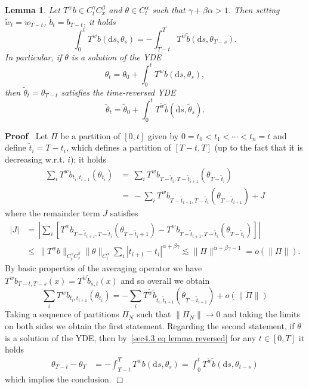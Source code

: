 \documentclass[10pt]{article}
\newcommand{\mathd}{\mathrm{d}}
\newenvironment{proof}{\noindent\textbf{Proof\ }}{\hspace*{\fill}$\Box$\medskip}
\newtheorem{lemma}{Lemma}
\begin{document}
\begin{lemma}
  \label{sec4.3 lemma reversed YDE}Let $T^w b \in C^{\gamma}_t C^{\beta}_x$
  and $\theta \in C^{\alpha}_t$ such that $\gamma + \beta \alpha > 1$. Then
  setting $\tilde{w}_t = w_{T - t}$, $\tilde{b}_t = b_{T - t}$, it holds
  \begin{equation}
    \int_0^t T^w b (\mathd s, \theta_s) = - \int_{T - t}^T T^{\tilde{w}}
    \tilde{b} (\mathd s, \theta_{T - s}) . \label{sec4.3 eq lemma reversed}
  \end{equation}
  In particular, if $\theta$ is a solution of the YDE
  \[ \theta_t = \theta_0 + \int_0^t T^w b (\mathd s, \theta_s), \]
  then $\tilde{\theta}_t = \theta_{T - t}$ satisfies the time-reversed YDE
  \[ \tilde{\theta}_t = \tilde{\theta}_0 + \int_0^t T^{\tilde{w}} \tilde{b}
     (\mathd s, \tilde{\theta}_s) . \]
\end{lemma}

\begin{proof}
  Let $\Pi$ be a partition of $[0, t]$ given by $0 = t_0 < t_1 < \cdots < t_n
  = t$ and define $\tilde{t}_i = T - t_i$, which defines a partition of $[T -
  t, T]$ (up to the fact that it is decreasing w.r.t. $i$); it holds
%  
  \begin{align*}
    \sum_i T^w b_{t_i, t_{i + 1}}^{} (\theta_{t_i}) & = \, \sum_i T^w b_{T -
    \tilde{t}_i, T - \tilde{t}_{i + 1}} (\theta_{T - \tilde{t}_i})\\
    & = \, - \sum_i T^w b_{T - \tilde{t}_{i + 1}, T - \tilde{t}_i} (\theta_{T
    - \tilde{t}_{i + 1}}) + J
  \end{align*}
%  
  where the remainder term $J$ satisfies
%  
  \begin{align*}
    | J | & = \, \left| \sum_i [T^w b_{T - \tilde{t}_{i + 1}, T - \tilde{t}_i}
    (\theta_{T - \tilde{t}_i + 1}) - T^w b_{T - \tilde{t}_{i + 1}, T -
    \tilde{t}_i} (\theta_{T - \tilde{t}_i})] \right|\\
    & \leqslant \, \| T^w b \|_{C^{\gamma}_t C^{\beta}_x}  \| \theta
    \|_{C_t^{\alpha}} \sum_i | t_{i + 1} - t_i |^{\alpha + \beta \gamma}
    \lesssim \| \Pi \|^{\alpha + \beta \gamma - 1} = o (\| \Pi \|) .
  \end{align*}
%  
  By basic properties of the averaging operator we have $T^w b_{T - t, T - s}
  (x) = T^{\tilde{w}} \tilde{b}_{s, t} (x)$ and so overall we obtain
  \[ \sum_i T^w b_{t_i, t_{i + 1}}^{} (\theta_{t_i}) = - \sum_i T^{\tilde{w}}
     \tilde{b}_{\tilde{t}_i, \tilde{t}_{i + 1}} (\theta_{T - \tilde{t}_{i +
     1}}) + o (\| \Pi \|) \]
  Taking a sequence of partitions $\Pi_N$ such that $\| \Pi_N \| \rightarrow
  0$ and taking the limits on both sides we obtain the first statement.
  Regarding the second statement, if $\theta$ is a solution of the YDE, then
  by~{\eqref{sec4.3 eq lemma reversed}} for any $t \in [0, T]$ it holds
%  
  \begin{align*}
    \theta_{T - t} - \theta_T & = - \int_{T - t}^T T^w b (\mathd s, \theta_s)
    = \int_0^t T^{\tilde{w}} \tilde{b} (\mathd s, \theta_{t - s})
  \end{align*}
%  
  which implies the conclusion.
\end{proof}
\end{document}
